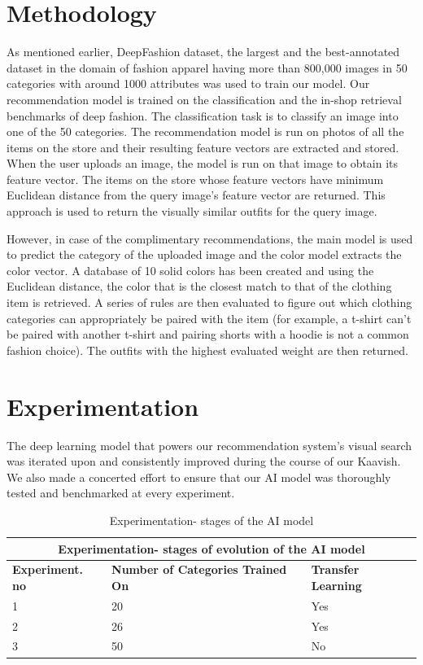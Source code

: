 \section{Methodology}
As mentioned earlier, DeepFashion dataset, the largest and the best-annotated dataset in the domain of fashion apparel having more than 800,000 images in 50 categories with around 1000 attributes was used to train our model. Our recommendation model is trained on the classification and the in-shop retrieval benchmarks of deep fashion. The classification task is to classify an image into one of the 50 categories. The recommendation model is run on photos of all the items on the store and their resulting feature vectors are extracted and stored. When the user uploads an image, the model is run on that image to obtain its feature vector. The items on the store whose feature vectors have minimum Euclidean distance from the query image's feature vector are returned. This approach is used to return the visually similar outfits for the query image.

However, in case of the complimentary recommendations, the main model is used to predict the category of the uploaded image and the color model extracts the color vector. A database of 10 solid colors has been created and using the Euclidean distance, the color that is the closest match to that of the clothing item is retrieved. A series of rules are then evaluated to figure out which clothing categories can appropriately be paired with the item (for example, a t-shirt can't be paired with another t-shirt and pairing shorts with a hoodie is not a common fashion choice). The outfits with the highest evaluated weight are then returned. 


\section{Experimentation}
The deep learning model that powers our recommendation system's visual search was iterated upon and consistently improved during the course of our Kaavish. We also made a concerted effort to ensure that our AI model was thoroughly tested and benchmarked at every experiment.

\begin{table}[H]
\begin{tabular}{ @{}|p{4cm}|p{5cm}|p{5cm}|  }
 \hline
 \multicolumn{3}{|c|}{\textbf{Experimentation- stages of evolution of the AI model}} \\
 \hline
 \textbf{Experiment. no} & \textbf{Number of Categories Trained On} & \textbf{Transfer Learning}\\
 
\hline
 1 & 20 & Yes \\ 
 \hline
 2 & 26 & Yes \\ 
 \hline
  3 & 50 & No \\
 \hline
\end{tabular}
\caption{Experimentation- stages of the AI model}
\label{table:Experimentation- stages of AI model}
\end{table}


